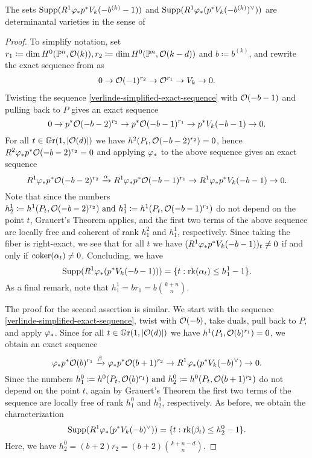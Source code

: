 \begin{proposition} \label{supp-are-det-varieties}
The sets
$\operatorname{Supp}(R^1 \varphi_{*}p^{*} V_{k}(-b^{(k)}-1))$ and
$\operatorname{Supp}(R^1 \varphi_{*}(p^{*} V_{k}(-b^{(k)})^\vee))$ 
are determinantal varieties in the sense of \cite[Ch.~II, §4]{arbarello-geometry-algebraic-curves}
\end{proposition}
\begin{proof}
To simplify notation, set
$r_1 \coloneqq \dim H^0(\mathbb{P}^n, \mathcal{O}(k)),
r_2 \coloneqq \dim H^0(\mathbb{P}^n, \mathcal{O}(k-d))$ and $b\coloneqq b^{(k)}$,
and rewrite the exact sequence from  as
\begin{align} \label{verlinde-simplified-exact-sequence}
\ses{\mc{O}(-1)^{r_2}}{\mc{O}^{r_1}}{V_k}. %
\end{align}
Twisting the sequence \cref{verlinde-simplified-exact-sequence} with $\mathcal{O}(-b-1)$ and pulling back to $P$ gives an exact sequence
\[
0
\to  {p^{*}\mathcal{O}(-b-2)^{r_2}}
\to  {p^{*}\mathcal{O}(-b-1)^{r_1}}
\to  {p^{*}V_k(-b-1)}
\to  0.
\]
For all $t\in \mathbb G \mathrm r(1,\lvert\mathcal{O}(d)\rvert)$ we have
$h^2(P_t, \mathcal{O}(-b-2)^{r_2}) = 0$,
hence
$R^2\varphi_{*}p^{*}\mathcal{O}(-b-2)^{r_2} = 0$
and applying $\varphi_{*}$ to the above sequence gives an exact sequence
\[
R^1\varphi_{*}p^{*}\mathcal{O}(-b-2)^{r_2}
\xrightarrow{\alpha}
R^1\varphi_{*}p^{*}\mathcal{O}(-b-1)^{r_1} 
\to
R^1\varphi_{*}p^{*} V_k(-b-1)
\to 0.
\]
Note that since the numbers
$
h^{1}_{2}\coloneqq h^1(P_t, \mathcal{O}(-b-2)^{r_2})
\text{ and }
h_{1}^{1}\coloneqq h^1(P_t, \mathcal{O}(-b-1)^{r_1})
$
do not depend on the point $t$, Grauert's Theorem applies, and the first two terms of the above sequence are locally free and coherent of rank $h_1^2$ and $h_1^1$, respectively. Since taking the fiber is right-exact, we see that for all $t$ we have
$(R^1\varphi_{*}p^{*} V_k(-b-1))_t \neq 0$ if and only if $\operatorname{coker}(\alpha_t) \neq 0$. Concluding, we have
\[
\operatorname{Supp}(R^1\varphi_{*}(p^{*} V_k(-b-1)))
= \{t : \operatorname{rk} (\alpha_t)\leq h^{1}_1 - 1\}.
\]
As a final remark, note that $h^1_1 = b r_1 = b \binom{k+n}{n}.$

The proof for the second assertion is similar. We start with the sequence \cref{verlinde-simplified-exact-sequence}, twist with $\mathcal{O}(-b)$, take duals, pull back to $P$, and apply $\varphi_{*}$. Since for all $t\in \mathbb G \mathrm r(1,\lvert\mathcal{O}(d)\rvert)$ we have $h^1(P_t, \mathcal{O}(b)^{r_1})=0$, we obtain an exact sequence
\[
	{\varphi_{*}p^{*}\mathcal{O}(b)^{r_1} }
\xrightarrow{\beta}	{\varphi_{*}p^{*}\mathcal{O}(b+1)^{r_2}}
\to	{R^1 \varphi_{*}(p^{*} V_{k}(-b)^\vee)}
\to 0.
\]
Since the numbers
$
h^0_1 \coloneqq h^0(P_t,\mathcal{O}(b)^{r_1}) \text{ and }
h^0_2 \coloneqq h^0(P_t, \mathcal{O}(b+1)^{r_2})
$
do not depend on the point $t$, again by Grauert's Theorem the first two terms of the sequence are locally free of rank $h^0_1$ and $h^0_2$, respectively. As before, we obtain the characterization
\[
	\operatorname{Supp}(R^1 \varphi_{*}(p^{*} V_{k}(-b)^\vee))
	= \{t : \operatorname{rk} (\beta_t)\leq h^{0}_2 - 1\}.
\]
Here, we have $h_2^0 = (b+2)r_2 = (b+2)\binom{k+n-d}{n}.$
\end{proof}

